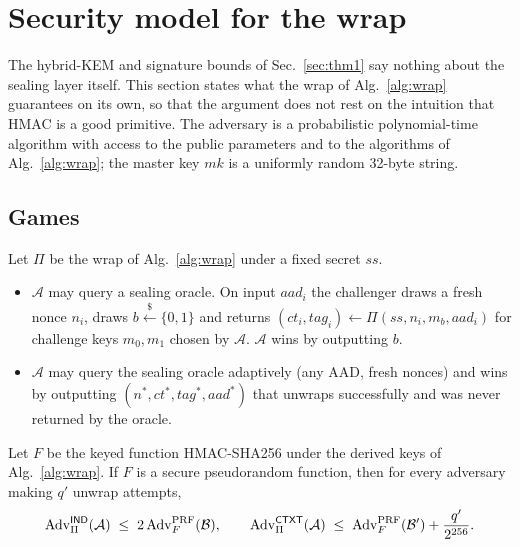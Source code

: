 
\section{Security model for the wrap}
\label{sec:model}

The hybrid-KEM and signature bounds of Sec.~\ref{sec:thm1} say nothing about
the sealing layer itself. This section states what the wrap of
Alg.~\ref{alg:wrap} guarantees on its own, so that the argument does not rest
on the intuition that HMAC is a good primitive. The adversary is a
probabilistic polynomial-time algorithm with access to the public parameters
and to the algorithms of Alg.~\ref{alg:wrap}; the master key $mk$ is a
uniformly random 32-byte string.

\subsection{Games}

\begin{definition}
\label{def:games}
Let $\Pi$ be the wrap of Alg.~\ref{alg:wrap} under a fixed secret $ss$.
\begin{itemize}
  \item[$\mathsf{IND}$:] $\mathcal{A}$ may query a sealing oracle. On input
    $aad_i$ the challenger draws a fresh nonce $n_i$, draws
    $b \xleftarrow{\$} \{0,1\}$ and returns
    $(ct_i, tag_i) \gets \Pi(ss, n_i, m_b, aad_i)$ for challenge keys
    $m_0, m_1$ chosen by $\mathcal{A}$. $\mathcal{A}$ wins by outputting $b$.
  \item[$\mathsf{CTXT}$:] $\mathcal{A}$ may query the sealing oracle
    adaptively (any AAD, fresh nonces) and wins by outputting
    $(n^\ast, ct^\ast, tag^\ast, aad^\ast)$ that unwraps successfully and was
    never returned by the oracle.
\end{itemize}
\end{definition}

\begin{theorem}
\label{thm:seal}
Let $F$ be the keyed function HMAC-SHA256 under the derived keys of
Alg.~\ref{alg:wrap}. If $F$ is a secure pseudorandom function, then for every
adversary making $q'$ unwrap attempts,
\[
  \mathrm{Adv}^{\mathsf{IND}}_{\Pi}(\mathcal{A}) \;\le\; 2\,\mathrm{Adv}^{\mathrm{PRF}}_{F}(\mathcal{B}),
  \qquad
  \mathrm{Adv}^{\mathsf{CTXT}}_{\Pi}(\mathcal{A}) \;\le\;
  \mathrm{Adv}^{\mathrm{PRF}}_{F}(\mathcal{B}') + \frac{q'}{2^{256}} .
\]
\end{theorem}

